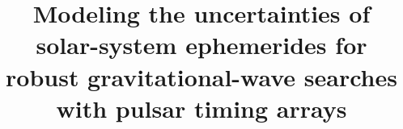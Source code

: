\documentclass{aastex63}
\begin{document}
\title{Modeling the uncertainties of solar-system ephemerides for robust gravitational-wave searches with pulsar timing arrays}


\end{document}
